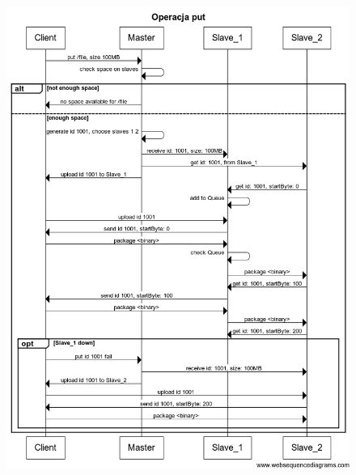 \begin{figure}[H]
\center
\flushleft
\includegraphics[keepaspectratio=true, scale=0.5]{img/put_op.png}
\end{figure}


